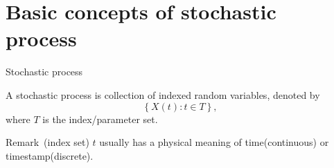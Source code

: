 \documentclass[utf-8, 10pt, aspectratio=1610]{beamer}
\begin{document}
\section{Basic concepts of stochastic process}
\begin{frame}[allowframebreaks]{Stochastic process}
	\vspace*{\fill}
	\begin{definition}
		A stochastic process is collection of indexed random variables, denoted by
		\begin{equation}
			\left\{X(t): t\in T\right\},
		\end{equation}
		where \(T\) is the index/parameter set.
	\end{definition}
	\vspace*{\fill}
	\begin{block}{Remark\ (index set)}
		\(t \) usually has a physical meaning of time(continuous) or timestamp(discrete).
	\end{block}
	\vspace*{\fill}
\end{frame}
\end{document}
